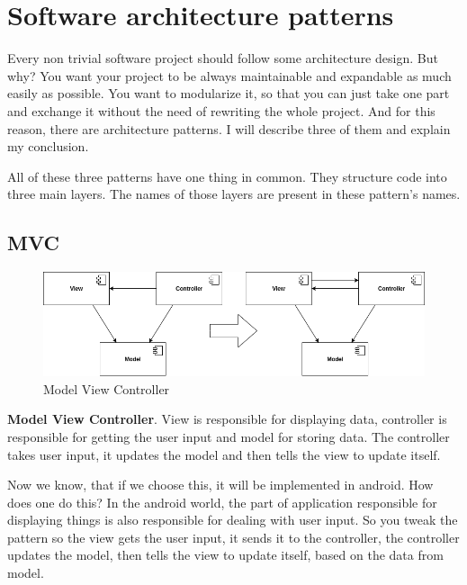 
\section{Software architecture patterns}
Every non trivial software project should follow some architecture design.
But why? You want your project to be always maintainable and expandable as much easily as possible.
You want to modularize it, so that you can just take one part and exchange it without the need of rewriting the whole project.
And for this reason, there are architecture patterns.
I will describe three of them and explain my conclusion.

All of these three patterns have one thing in common.
They structure code into three main layers.
The names of those layers are present in these pattern's names.

\subsection{MVC}

\begin{figure}\centering
	\includegraphics[width=1\textwidth]{pics/patterns/bc-mvc2.png}
	\caption[MVC]{Model View Controller}\label{fig:mvc}
\end{figure}

\textbf{Model View Controller}.
View is responsible for displaying data, controller is responsible for getting the user input and model for storing data.
The controller takes user input, it updates the model and then tells the view to update itself.

Now we know, that if we choose this, it will be implemented in android.
How does one do this? In the android world, the part of application responsible for displaying things is also responsible for dealing with user input.
So you tweak the pattern so the view gets the user input, it sends it to the controller, the controller updates the model, then tells the view to update itself, based on the data from model.

